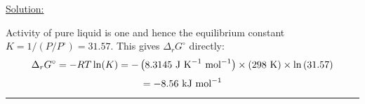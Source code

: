 \noindent
\underline{Solution:}

Activity of pure liquid is one and hence the equilibrium constant $K = 1 / (P / P^\circ) = 31.57$. This gives $\Delta_rG^\circ$ directly:
$$\Delta_rG^\circ = -RT\ln(K) = -\left(8.3145\textnormal{ J K}^{-1}\textnormal{ mol}^{-1}\right)\times\left(298\textnormal{ K}\right)\times\ln\left(31.57\right)$$
$$ = -8.56\textnormal{ kJ mol}^{-1}$$

\hrule\vspace{0.5cm}
